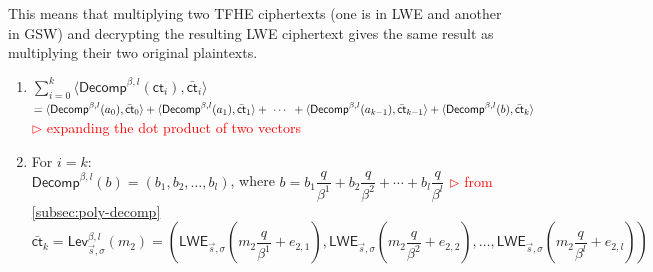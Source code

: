 This means that multiplying two TFHE ciphertexts (one is in LWE and another in GSW) and decrypting the resulting LWE ciphertext gives the same result as multiplying their two original plaintexts. 


\begin{myproof}
\begin{enumerate}
\item $\sum\limits_{i=0}^{k}\langle \textsf{Decomp}^{\beta, l}(\textsf{ct}_i), \bar{\textsf{ct}}_i \rangle$ \\
$= \langle \textsf{Decomp}^{\beta, l}(a_0), \bar{\textsf{ct}}_0 \rangle + \langle \textsf{Decomp}^{\beta, l}(a_1), \bar{\textsf{ct}}_1 \rangle + \text{ } \text{$\cdots$} \text{ } + \langle \textsf{Decomp}^{\beta, l}(a_{k-1}), \bar{\textsf{ct}}_{k-1} \rangle + \langle \textsf{Decomp}^{\beta, l}(b), \bar{\textsf{ct}}_k \rangle$ \\
\textcolor{red}{ $\rhd$ expanding the dot product of two vectors}
\item For $i = k$: \\
$\textsf{Decomp}^{\beta, l}(b) = (b_1, b_2, \ldots , b_l)$, where $b = b_1\dfrac{q}{\beta^1} + b_2\dfrac{q}{\beta^2} + \cdots + b_l\dfrac{q}{\beta^l}$ \textcolor{red}{ $\rhd$ from \autoref{subsec:poly-decomp}}\\
$\bar{\textsf{ct}}_k = \textsf{Lev}_{\vec{s}, \sigma}^{\beta, l}(m_2) = \left(\textsf{LWE}_{\vec{s}, \sigma}\left(m_{2}\dfrac{q}{\beta^1} + e_{2, 1}\right), \textsf{LWE}_{\vec{s}, \sigma}\left(m_{2}\dfrac{q}{\beta^2} + e_{2, 2}\right), \ldots, \textsf{LWE}_{\vec{s}, \sigma}\left(m_{2}\dfrac{q}{\beta^l} + e_{2, l}\right) \right)$ \\
$ $


\end{enumerate}
\end{myproof}
